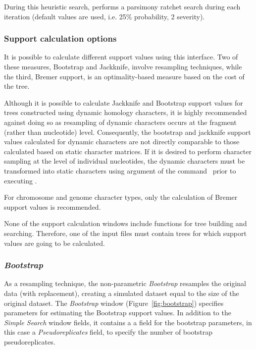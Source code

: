 {During this heuristic search, \poy performs a parsimony ratchet search during each iteration (default values are used, 
i.e. 25\% probability, 2 severity).

\subsubsection{Support calculation options}

It is possible to calculate different support values using this interface.  Two of these measures, Bootstrap and 
Jackknife, involve resampling techniques, while the third, Bremer support, is an optimality-based measure based 
on the cost of the tree. 

Although it is 
possible to calculate Jackknife and Bootstrap support values for trees constructed using dynamic homology 
characters, it is highly recommended against doing so as resampling of dynamic characters occurs at the 
fragment (rather than nucleotide) level.  Consequently, the bootstrap and jackknife support values
calculated for dynamic characters are not directly comparable to those calculated based on static 
character matrices. If it is desired to perform character sampling at the level of individual nucleotides, 
the dynamic characters must be transformed into static characters using 
argument of the command~ prior to executing .

For chromosome and genome character types, only the calculation of Bremer support values is recommended.

None of the support calculation windows include functions for tree building and searching. Therefore, one of the 
input files must contain trees for which support values are going to be calculated.

\subsubsection*{\emph{Bootstrap}}

As a resampling technique, the non-parametric \emph{Bootstrap} resamples the original data (with replacement), 
creating a simulated dataset equal to the size of the original dataset. The \emph{Bootstrap} window 
(Figure~\ref{fig:bootstrap}) specifies parameters for estimating the Bootstrap support values. In addition to the 
\emph{Simple Search} window fields, it contains a a field for the bootstrap parameters, in this case a 
\emph{Pseudoreplicates} field, to specify the number of bootstrap pseudoreplicates.

}
